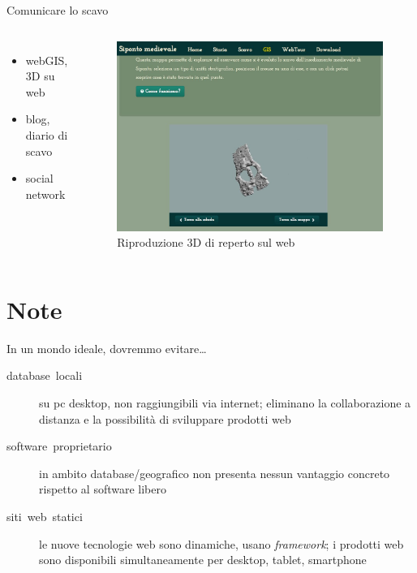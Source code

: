 \documentclass{beamer}
\begin{document}
        \begin{frame}{Comunicare lo scavo}
            \begin{columns}[c]
                    \begin{itemize}
                        \item webGIS, 3D su web
                        \item blog, diario di scavo
                        \item social network
                    \end{itemize}
                \begin{figure}
                    \centering
                    \includegraphics[width=1\textwidth]{screen_3d}
                    \caption[Riproduzione 3D di reperto sul web]{Riproduzione 3D di reperto sul web}
                    \label{fig:3dweb}
                \end{figure}
            \end{columns}
        \end{frame}

    \section{Note}

        \begin{frame}{In un mondo ideale, dovremmo evitare\ldots}
            \begin{description}
                \item[database~locali] su pc desktop, non raggiungibili via internet; eliminano la collaborazione a distanza e la possibilità di sviluppare prodotti web
                \item[software~proprietario] in ambito database/geografico non presenta nessun vantaggio concreto rispetto al software libero
                \item[siti~web~statici] le nuove tecnologie web sono dinamiche, usano \emph{framework}; i prodotti web sono disponibili simultaneamente per desktop, tablet, smartphone
            \end{description}
        \end{frame}
\end{document}
